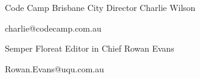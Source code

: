 
\begin{center}
\end{center}

\begin{cventries}
\cventry
{Code Camp Brisbane City Director} %
{Charlie Wilson} %
{} %
{} %
{ %
\begin{cvitems}
\item charlie@codecamp.com.au
\end{cvitems}
}
\cventry
{Semper Floreat Editor in Chief} %
{Rowan Evans} %
{} %
{} %
{ %
\begin{cvitems}
\item Rowan.Evans@uqu.com.au
\end{cvitems}
}

\end{cventries}